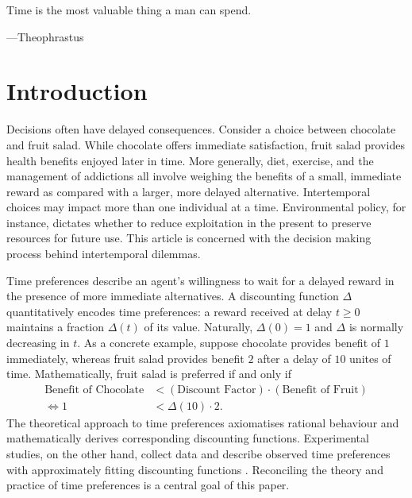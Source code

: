 \documentclass[titlepage, hidelinks, 12pt]{article}
\theoremstyle{plain}
\theoremstyle{remark}
\theoremstyle{definition}
\begin{document}
\epigraph{Time is the most valuable thing a man can spend.}{---Theophrastus}
\linenumbers
\section{Introduction}

Decisions often have delayed consequences. Consider a choice between chocolate and fruit salad.
While chocolate offers immediate satisfaction, fruit salad provides health benefits enjoyed later in time. 
More generally, diet, exercise, and the management of addictions all involve weighing the benefits of a small, immediate 
reward as compared with a larger, more delayed alternative. 
Intertemporal choices may impact more than one individual at a time. Environmental policy, for instance,
dictates whether to reduce exploitation in the present to preserve resources for future use. 
This article is concerned with the decision making process behind intertemporal dilemmas. 




Time preferences describe an agent's willingness to wait for a delayed reward in the presence of more immediate alternatives. 
A discounting function $\Delta$ quantitatively encodes time preferences: a reward received at delay $t\ge0$ maintains a fraction
$\Delta(t)$ of its value. Naturally, $\Delta(0) = 1$ and $\Delta$ is normally decreasing in $t$. 
As a concrete example, suppose chocolate provides benefit of $1$ immediately, whereas fruit salad provides benefit $2$ after a delay of $10$ unites
of time. 
Mathematically, fruit salad is preferred if and only if
\begin{align}
    \text{Benefit of Chocolate} &< (\text{Discount Factor}) \cdot (\text{Benefit of Fruit}) \\
    \iff 1 &< \Delta(10) \cdot 2.
    \label{eqn:choco_or_fruit}
\end{align}
The theoretical approach to time preferences axiomatises rational behaviour and mathematically derives corresponding discounting
functions. Experimental studies, on the other hand, collect data and describe observed time preferences with approximately fitting discounting
functions \cite{mazur85, ainslie75, green81, green04}. Reconciling the theory and practice of time preferences is a central goal of this paper. 
\end{document}

